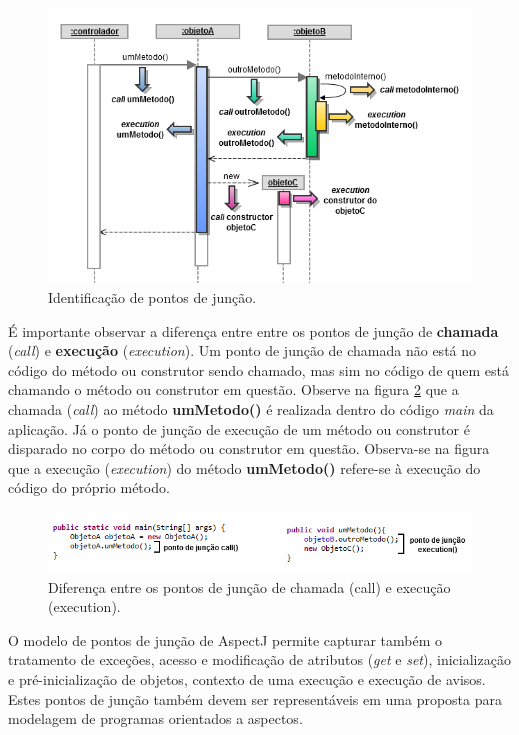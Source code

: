 \begin{figure}[!hb]
	\centering
	\includegraphics{img/aspects_join_point_model.png}
	\caption{Identificação de pontos de
	junção.}\label{fig:aspects_join_point_model}
\end{figure}

É importante observar a diferença entre entre os pontos de junção de \textbf{chamada} (\textit{call}) e \textbf{execução} (\textit{execution}). Um
ponto de junção de chamada não está no código do método ou construtor sendo chamado, mas sim no código de quem está chamando o método ou construtor em
questão. Observe na figura \ref{fig:call_vs_execution} que a chamada (\textit{call}) ao método \textbf{umMetodo()} é realizada dentro do código
\textit{main} da aplicação. Já o ponto de junção de execução de um método ou construtor é disparado no corpo do método ou construtor em questão.
Observa-se na figura que a execução (\textit{execution}) do método \textbf{umMetodo()} refere-se à execução do código do próprio método.

\begin{figure}[!hb]
	\centering
	\includegraphics{img/call_vs_execution.png}
	\caption{Diferença entre os pontos de junção de chamada (call) e
	execução (execution).}\label{fig:call_vs_execution}
\end{figure}

O modelo de pontos de junção de AspectJ permite capturar também o tratamento de exceções, acesso e modificação de atributos (\textit{get} e
\textit{set}), inicialização e pré-inicialização de objetos, contexto de uma execução e execução de avisos. Estes pontos de junção também devem ser
representáveis em uma proposta para modelagem de programas orientados a aspectos.


